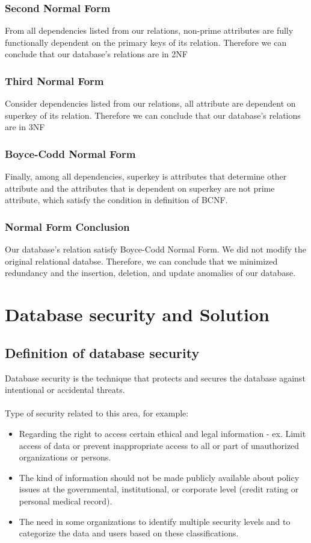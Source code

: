 \documentclass[12pt,a4paper]{article}
\begin{document}
  \subsubsection{Second Normal Form}
  From all dependencies listed from our relations, non-prime attributes are fully functionally dependent on the primary keys of its relation. Therefore we can conclude that our database's relations are in 2NF
  
  \subsubsection{Third Normal Form}
  Consider dependencies listed from our relations, all attribute are dependent on superkey of its relation. Therefore we can conclude that our database's relations are in 3NF
  
  \subsubsection{Boyce-Codd Normal Form}
  Finally, among all dependencies, superkey is attributes that determine other attribute and the attributes that is dependent on superkey are not prime attribute, which satisfy the condition in definition of BCNF.
 
 \subsubsection{Normal Form Conclusion}
 Our database's relation satisfy Boyce-Codd Normal Form.
 We did not modify the original relational databse. Therefore, we can conclude that we minimized redundancy and the insertion, deletion, and update anomalies of our database.
 
 \section{Database security and Solution}
 \subsection{Definition of database security}
 \indent Database security is the technique that protects and secures the database against intentional or accidental threats. \\\\
 \indent Type of security related to this area, for example:
 \begin{itemize}
     \item Regarding the right to access certain ethical and legal information - ex. Limit access of data or prevent inappropriate access to all or part of unauthorized organizations or persons.
     \item The kind of information should not be made publicly available about policy issues at the governmental, institutional, or corporate level (credit rating or personal medical record).
     \item The need in some organizations to identify multiple security levels and to categorize the data and users based on these classifications.
 \end{itemize}
 
\end{document}
